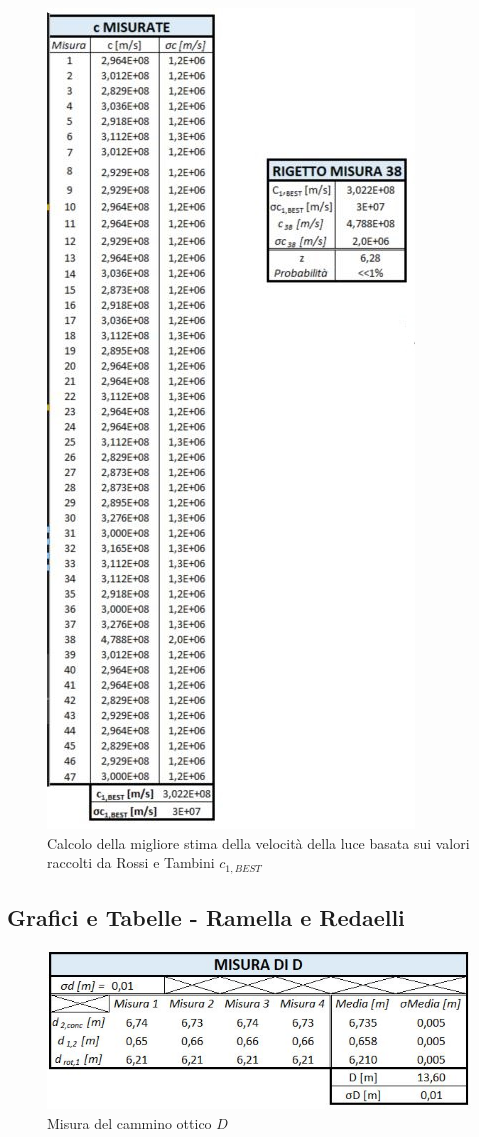 \documentclass{article}
\begin{document}
\begin{figure}[h]
    \centering
    \includegraphics[width=0.6\linewidth]{Rigetto.JPG}
    \caption{Calcolo della migliore stima della velocità della luce basata sui valori raccolti da Rossi e Tambini $c_{1,BEST}$}
    \label{Rigetto}
\end{figure}
\FloatBarrier %

\newpage
\subsection{Grafici e Tabelle - Ramella e Redaelli} \label{RAM}

\begin{figure}[h!]
    \centering
    \includegraphics[width=0.55\linewidth]{RAM_D.JPG}
    \caption{Misura del cammino ottico $D$}
    \label{RAM_D}
\end{figure}
\end{document}
